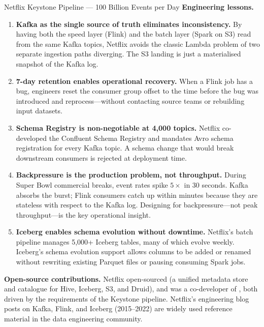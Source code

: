 \begin{casestudy}{Netflix Keystone Pipeline --- 100 Billion Events per Day}
\medskip
\textbf{Engineering lessons.}
\begin{enumerate}
  \item \textbf{Kafka as the single source of truth eliminates
        inconsistency.} By having both the speed layer (Flink) and the
        batch layer (Spark on S3) read from the same Kafka topics, Netflix
        avoids the classic Lambda problem of two separate ingestion paths
        diverging. The S3 landing is just a materialised snapshot of the
        Kafka log.
  \item \textbf{7-day retention enables operational recovery.} When a
        Flink job has a bug, engineers reset the consumer group offset to
        the time before the bug was introduced and reprocess---without
        contacting source teams or rebuilding input datasets.
  \item \textbf{Schema Registry is non-negotiable at 4{,}000 topics.}
        Netflix co-developed the Confluent Schema Registry and mandates
        Avro schema registration for every Kafka topic. A schema change
        that would break downstream consumers is rejected at deployment time.
  \item \textbf{Backpressure is the production problem, not throughput.}
        During Super Bowl commercial breaks, event rates spike $5\times$
        in 30 seconds. Kafka absorbs the burst; Flink consumers catch
        up within minutes because they are stateless with respect to the
        Kafka log. Designing for backpressure---not peak throughput---is
        the key operational insight.
  \item \textbf{Iceberg enables schema evolution without downtime.}
        Netflix's batch pipeline manages 5{,}000+ Iceberg tables, many
        of which evolve weekly. Iceberg's schema evolution support allows
        columns to be added or renamed without rewriting existing Parquet
        files or pausing consuming Spark jobs.
\end{enumerate}

\medskip
\textbf{Open-source contributions.} Netflix open-sourced 
(a unified metadata store and catalogue for Hive, Iceberg, S3, and Druid),
and was a co-developer of , both driven by the
requirements of the Keystone pipeline. Netflix's engineering blog posts
on Kafka, Flink, and Iceberg (2015--2022) are widely used reference
material in the data engineering community.
\end{casestudy}

